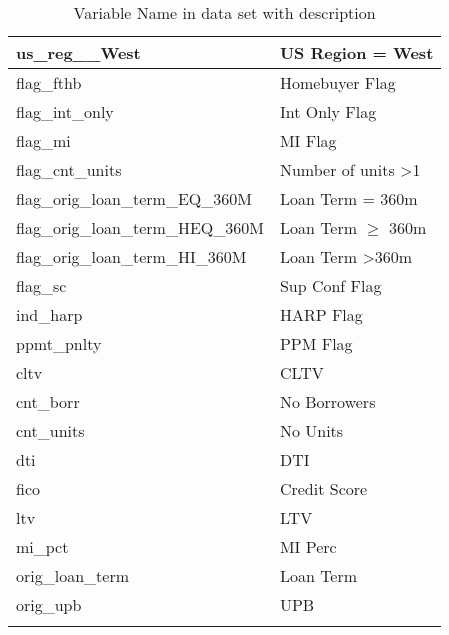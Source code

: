 \begin{longtable}{lp{8cm}}
us\_reg\_\_West                    & US Region = West                                                     \\\hline
flag\_fthb                         & Homebuyer Flag                                                       \\
flag\_int\_only                    & Int Only Flag                                                        \\
flag\_mi                           & MI Flag                                                              \\
flag\_cnt\_units                   & Number of units \textgreater 1                                       \\
flag\_orig\_loan\_term\_EQ\_360M   & Loan Term = 360m                                                     \\
flag\_orig\_loan\_term\_HEQ\_360M  & Loan Term $\geq$ 360m                                                \\
flag\_orig\_loan\_term\_HI\_360M   & Loan Term \textgreater 360m                                          \\\hline
flag\_sc                           & Sup Conf Flag                                                        \\
ind\_harp                          & HARP Flag                                                            \\
ppmt\_pnlty                        & PPM Flag                                                             \\\hline
cltv                               & CLTV                                                                 \\
cnt\_borr                          & No Borrowers                                                         \\
cnt\_units                         & No Units                                                             \\
dti                                & DTI                                                                  \\
fico                               & Credit Score                                                         \\
ltv                                & LTV                                                                  \\
mi\_pct                            & MI Perc                                                              \\
orig\_loan\_term                   & Loan Term                                                            \\
orig\_upb                          & UPB                                                                  \\\bottomrule

\caption{Variable Name in data set with description}
\end{longtable}

